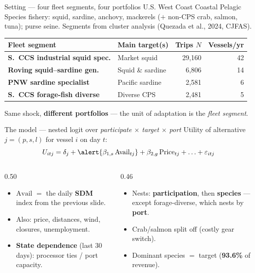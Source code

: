 \documentclass[aspectratio=169,11pt]{beamer}
\newcommand{\takeaway}[1]{\vfill\begin{takeawaybox}\small #1\end{takeawaybox}\vskip2pt}
\begin{document}
\begin{frame}{Setting --- four fleet segments, four portfolios}
\footnotesize
U.S. West Coast Coastal Pelagic Species fishery: squid, sardine, anchovy, mackerels
($+$ non-CPS crab, salmon, tuna); purse seine. Segments from cluster analysis
(Quezada et al., 2024, CJFAS).
\vskip4pt
\begin{tabular}{@{}p{} p{} r r@{}}
\toprule
Fleet segment & Main target(s) & Trips $N$ & Vessels/yr \\
\midrule
\textbf{S.\ CCS industrial squid spec.} & Market squid & 29{,}160 & 42 \\
\textbf{Roving squid--sardine gen.}     & Squid \& sardine & 6{,}806 & 14 \\
\textbf{PNW sardine specialist}         & Pacific sardine & 2{,}581 & 6 \\
\textbf{S.\ CCS forage-fish diverse}    & Diverse CPS & 2{,}481 & 5 \\
\bottomrule
\end{tabular}
\takeaway{Same shock, \textbf{different portfolios} --- the unit of adaptation is the \emph{fleet segment}.}
\end{frame}

\begin{frame}{The model --- nested logit over \emph{participate $\times$ target $\times$ port}}
\small
Utility of alternative $j=(p,s,l)$ for vessel $i$ on day $t$:
\[
  U_{itj}= \delta_j + \alert{\beta_{1,s}\,\mathrm{Avail}_{tj}}
         + \beta_{2,g}\,\mathrm{Price}_{tj} + \ldots + \varepsilon_{itj}
\]
\vskip-2pt
\begin{columns}[T,onlytextwidth]
\begin{column}{0.50\textwidth}
\begin{itemize}\footnotesize
  \item \alert{$\mathrm{Avail}$} $=$ the daily \textbf{SDM} index from the previous slide.
  \item Also: price, distances, wind, closures, unemployment.
  \item \textbf{State dependence} (last 30 days): processor ties / port capacity.
\end{itemize}
\end{column}
\hfill
\begin{column}{0.46\textwidth}
\begin{itemize}\footnotesize
  \item Nests: \textbf{participation}, then \textbf{species} --- except forage-diverse,
        which nests by \textbf{port}.
  \item Crab/salmon split off (costly gear switch).
  \item Dominant species $=$ target (\textbf{93.6\%} of revenue).
\end{itemize}
\end{column}
\end{columns}
\end{frame}
\end{document}
